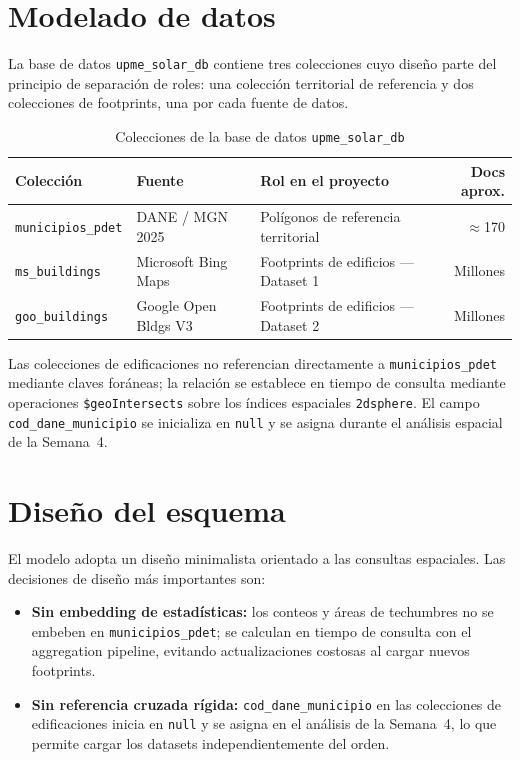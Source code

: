 \documentclass[12pt, a4paper]{report}
\begin{document}
\section{Modelado de datos}

La base de datos \texttt{upme\_solar\_db} contiene tres colecciones cuyo diseño
parte del principio de separación de roles: una colección territorial de referencia
y dos colecciones de footprints, una por cada fuente de datos.

\begin{table}[H]
  \centering
  \caption{Colecciones de la base de datos \texttt{upme\_solar\_db}}
  \label{tab:colecciones}
  \begin{tabularx}{\textwidth}{llXr}
    \toprule
    \textbf{Colección} & \textbf{Fuente} & \textbf{Rol en el proyecto} & \textbf{Docs aprox.} \\
    \midrule
    \texttt{municipios\_pdet} & DANE / MGN 2025      & Polígonos de referencia territorial & $\approx$170 \\
    \texttt{ms\_buildings}    & Microsoft Bing Maps  & Footprints de edificios — Dataset 1 & Millones \\
    \texttt{goo\_buildings}   & Google Open Bldgs V3 & Footprints de edificios — Dataset 2 & Millones \\
    \bottomrule
  \end{tabularx}
\end{table}

Las colecciones de edificaciones no referencian directamente a \texttt{municipios\_pdet}
mediante claves foráneas; la relación se establece en tiempo de consulta mediante
operaciones \texttt{\$geoIntersects} sobre los índices espaciales \texttt{2dsphere}.
El campo \texttt{cod\_dane\_municipio} se inicializa en \texttt{null} y se asigna
durante el análisis espacial de la Semana~4.

\section{Diseño del esquema}

El modelo adopta un diseño minimalista orientado a las consultas espaciales. Las
decisiones de diseño más importantes son:

\begin{itemize}
  \item \textbf{Sin embedding de estadísticas:} los conteos y áreas de techumbres
        no se embeben en \texttt{municipios\_pdet}; se calculan en tiempo de consulta
        con el aggregation pipeline, evitando actualizaciones costosas al cargar
        nuevos footprints.
  \item \textbf{Sin referencia cruzada rígida:} \texttt{cod\_dane\_municipio} en
        las colecciones de edificaciones inicia en \texttt{null} y se asigna en
        el análisis de la Semana~4, lo que permite cargar los datasets
        independientemente del orden.
\end{itemize}
\end{document}
